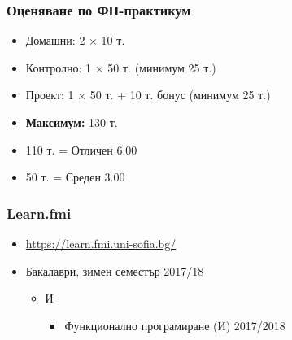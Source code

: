 \documentclass{beamer}
\begin{document}
\begin{frame}
  \frametitle{Оценяване по ФП-практикум}

  \begin{itemize}
  \item Домашни: 2 $\times$ 10 т.
  \item Контролно: 1 $\times$ 50 т. \alert{(минимум 25 т.)}
  \item Проект: 1 $\times$ 50 т. + 10 т. бонус \alert{(минимум 25 т.)}
  \item \textbf{Максимум:} 130 т.
  \item 110 т. = Отличен 6.00
  \item 50 т. = Среден 3.00
  \end{itemize}
\end{frame}

\begin{frame}
  \frametitle{Learn.fmi}
  
  \begin{itemize}
  \item \url{https://learn.fmi.uni-sofia.bg/}
  \item Бакалаври, зимен семестър 2017/18
    \begin{itemize}
    \item И
      \begin{itemize}
      \item Функционално програмиране (И) 2017/2018
      \end{itemize}
    \end{itemize}
  \end{itemize}
\end{frame}
\end{document}
